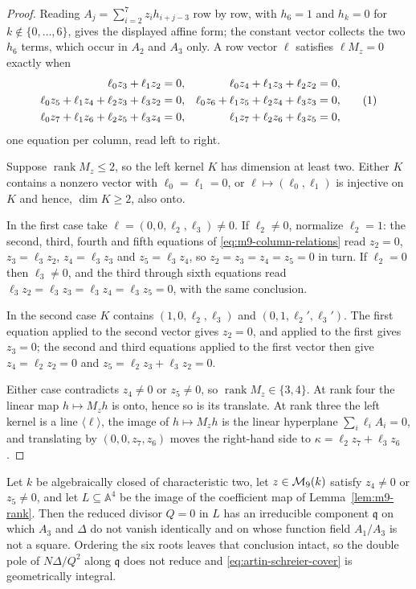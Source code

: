 \begin{proof}
Reading $A_j=\sum_{i=2}^7z_ih_{i+j-3}$ row by row, with $h_6=1$ and $h_k=0$
for $k\notin\{0,\ldots,6\}$, gives the displayed affine form; the constant
vector collects the two $h_6$ terms, which occur in $A_2$ and $A_3$ only.
A row vector $\ell$ satisfies $\ell M_z=0$ exactly when
\[
\begin{aligned}
 \ell_0z_3+\ell_1z_2&=0,&
 \ell_0z_4+\ell_1z_3+\ell_2z_2&=0,\\
 \ell_0z_5+\ell_1z_4+\ell_2z_3+\ell_3z_2&=0,&
 \ell_0z_6+\ell_1z_5+\ell_2z_4+\ell_3z_3&=0,\\
 \ell_0z_7+\ell_1z_6+\ell_2z_5+\ell_3z_4&=0,&
 \ell_1z_7+\ell_2z_6+\ell_3z_5&=0,
\end{aligned}
\autoeqtag{eq:m9-column-relations}
\]
one equation per column, read left to right.

Suppose $\operatorname{rank}M_z\leq2$, so the left kernel $K$ has dimension at
least two.  Either $K$ contains a nonzero vector with $\ell_0=\ell_1=0$, or
$\ell\mapsto(\ell_0,\ell_1)$ is injective on $K$ and hence, $\dim K\geq2$,
also onto.

In the first case take $\ell=(0,0,\ell_2,\ell_3)\neq0$.  If $\ell_2\neq0$,
normalize $\ell_2=1$: the second, third, fourth and fifth equations of
\eqref{eq:m9-column-relations} read $z_2=0$, $z_3=\ell_3z_2$,
$z_4=\ell_3z_3$ and $z_5=\ell_3z_4$, so $z_2=z_3=z_4=z_5=0$ in turn.  If
$\ell_2=0$ then $\ell_3\neq0$, and the third through sixth equations read
$\ell_3z_2=\ell_3z_3=\ell_3z_4=\ell_3z_5=0$, with the same conclusion.

In the second case $K$ contains $(1,0,\ell_2,\ell_3)$ and
$(0,1,\ell_2',\ell_3')$.  The first equation applied to the second vector
gives $z_2=0$, and applied to the first gives $z_3=0$; the second and third
equations applied to the first vector then give $z_4=\ell_2z_2=0$ and
$z_5=\ell_2z_3+\ell_3z_2=0$.

Either case contradicts $z_4\neq0$ or $z_5\neq0$, so
$\operatorname{rank}M_z\in\{3,4\}$.  At rank four the linear map $h\mapsto
M_zh$ is onto, hence so is its translate.  At rank three the left kernel is a
line $\langle\ell\rangle$, the image of $h\mapsto M_zh$ is the linear
hyperplane $\sum_i\ell_iA_i=0$, and translating by $(0,0,z_7,z_6)$ moves the
right-hand side to $\kappa=\ell_2z_7+\ell_3z_6$.
\end{proof}

\begin{lemma}\label{lem:m9-nonsquare}%
%
Let $k$ be algebraically closed of characteristic two, let $z\in\mathcal M_9(k)$
satisfy $z_4\neq0$ or $z_5\neq0$, and let $L\subseteq\mathbb A^4$ be the
image of the coefficient map of Lemma~\ref{lem:m9-rank}.  Then the reduced
divisor $Q=0$ in $L$ has an irreducible component $\mathfrak q$ on which
$A_3$ and $\Delta$ do not vanish identically and on whose function field
$A_1/A_3$ is not a square.  Ordering the six roots leaves that conclusion
intact, so the double pole of $N\Delta/Q^2$ along $\mathfrak q$ does not
reduce and \eqref{eq:artin-schreier-cover} is geometrically integral.
\end{lemma}

